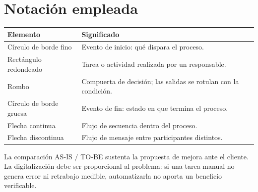 \documentclass[11pt,a4paper]{article}
\begin{document}
\section*{Notación empleada}

\begin{center}
\begin{tabularx}{\linewidth}{@{}L{4.2cm} Y@{}}
\toprule
\sffamily\bfseries\color{lgPrimario}Elemento &
\sffamily\bfseries\color{lgPrimario}Significado \\
\midrule
Círculo de borde fino     & Evento de inicio: qué dispara el proceso. \\
Rectángulo redondeado     & Tarea o actividad realizada por un responsable. \\
Rombo                     & Compuerta de decisión; las salidas se rotulan con la condición. \\
Círculo de borde gruesa   & Evento de fin: estado en que termina el proceso. \\
Flecha continua           & Flujo de secuencia dentro del proceso. \\
Flecha discontinua        & Flujo de mensaje entre participantes distintos. \\
\bottomrule
\end{tabularx}
\end{center}

\begin{nota}
La comparación AS-IS / TO-BE sustenta la propuesta de mejora ante el cliente. La
digitalización debe ser proporcional al problema: si una tarea manual no genera
error ni retrabajo medible, automatizarla no aporta un beneficio verificable.
\end{nota}
\end{document}
